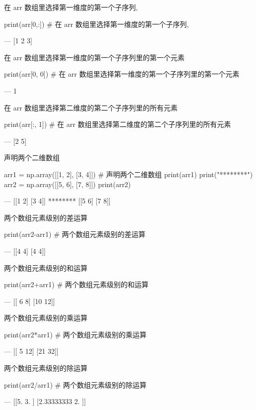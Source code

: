 在 arr 数组里选择第一维度的第一个子序列, 

\begin{python}
print(arr[0,:])            # 在 arr 数组里选择第一维度的第一个子序列, 

---
[1 2 3]
\end{python}

在 arr 数组里选择第一维度的第一个子序列里的第一个元素

\begin{python}
print(arr[0, 0])           # 在 arr 数组里选择第一维度的第一个子序列里的第一个元素

---
1
\end{python}

在 arr 数组里选择第二维度的第二个子序列里的所有元素

\begin{python}
print(arr[:, 1])           # 在 arr 数组里选择第二维度的第二个子序列里的所有元素

---
[2 5]
\end{python}

声明两个二维数组

\begin{python}
arr1 = np.array([[1, 2], [3, 4]])     # 声明两个二维数组
print(arr1)
print("********")
arr2 = np.array([[5, 6], [7, 8]])
print(arr2)

---
[[1 2]
 [3 4]]
********
[[5 6]
 [7 8]]
\end{python}

两个数组元素级别的差运算

\begin{python}
print(arr2-arr1)     # 两个数组元素级别的差运算

---
[[4 4]
 [4 4]]
\end{python}

两个数组元素级别的和运算

\begin{python}
print(arr2+arr1)     # 两个数组元素级别的和运算

---
[[ 6  8]
 [10 12]]
\end{python}

两个数组元素级别的乘运算

\begin{python}
print(arr2*arr1)     # 两个数组元素级别的乘运算

---
[[ 5 12]
 [21 32]]
\end{python}

两个数组元素级别的除运算

\begin{python}
print(arr2/arr1)     # 两个数组元素级别的除运算

---
[[5.         3.        ]
 [2.33333333 2.        ]]
\end{python}

